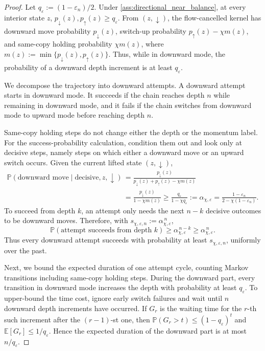 \documentclass{article}
\numberwithin{theorem}{section}
\numberwithin{proposition}{section}
\numberwithin{corollary}{section}
\numberwithin{lemma}{section}
\numberwithin{conjecture}{section}
\numberwithin{remark}{section}
\numberwithin{definition}{section}
\numberwithin{assumption}{section}
\numberwithin{example}{section}
\newcommand{\bbE}{\mathbb{E}}
\newcommand{\bbP}{\mathbb{P}}
\begin{document}
\begin{proof}
Let $q_{\varepsilon}:=(1-\varepsilon_n)/2$. Under
\cref{ass:directional_near_balance}, at every interior state $z$,
$p_{\downarrow}(z),p_{\uparrow}(z)\ge q_{\varepsilon}$. From
$(z,\downarrow)$, the flow-cancelled kernel has downward move probability
$p_{\downarrow}(z)$, switch-up probability
$p_{\uparrow}(z)-\chi m(z)$, and same-copy holding probability
$\chi m(z)$, where
$m(z):=\min\{p_{\downarrow}(z),p_{\uparrow}(z)\}$. Thus, while in downward
mode, the probability of a downward depth increment is at least
$q_{\varepsilon}$.

We decompose the trajectory into downward attempts. A downward attempt starts
in downward mode. It succeeds if the chain reaches depth $n$ while remaining
in downward mode, and it fails if the chain switches from downward mode to
upward mode before reaching depth $n$.

Same-copy holding steps do not change either the depth or the momentum label.
For the success-probability calculation, condition them out and look only at
decisive steps, namely steps on which either a downward move or an upward switch
occurs. Given the current lifted state $(z,\downarrow)$,
\begin{align*}
    \bbP(\text{downward move}\mid \text{decisive},z,\downarrow)
    &=
    \frac{p_{\downarrow}(z)}
    {p_{\downarrow}(z)+p_{\uparrow}(z)-\chi m(z)}\\
    &=
    \frac{p_{\downarrow}(z)}
    {1-\chi m(z)}
    \ge
    \frac{q_\varepsilon}
    {1-\chi q_\varepsilon}
    :=
    \alpha_{\chi,\varepsilon}
    =
    \frac{1-\varepsilon_n}{2-\chi(1-\varepsilon_n)}.
\end{align*}
To succeed from depth $k$, an attempt only needs the next $n-k$ decisive
outcomes to be downward moves. Therefore, with
$s_{\chi,\varepsilon,n}:=\alpha_{\chi,\varepsilon}^{\,n}$,
\begin{equation*}
    \bbP(\text{attempt succeeds from depth }k)
    \ge
    \alpha_{\chi,\varepsilon}^{\,n-k}
    \ge
    \alpha_{\chi,\varepsilon}^{\,n}.
\end{equation*}
Thus every downward attempt succeeds with probability at least
$s_{\chi,\varepsilon,n}$, uniformly over the past.

Next, we bound the expected duration of one attempt cycle, counting Markov
transitions including same-copy holding steps. During the downward part, every
transition in downward mode increases the depth with probability at least
$q_\varepsilon$. To upper-bound the time cost, ignore early switch failures
and wait until $n$ downward depth increments have occurred. If $G_r$ is the
waiting time for the $r$-th such increment after the $(r-1)$-st one, then
$\bbP(G_r>t)\le (1-q_\varepsilon)^t$ and
$\bbE[G_r]\le 1/q_\varepsilon$. Hence the expected duration of the downward
part is at most $n/q_\varepsilon$.


\end{proof}
\end{document}
